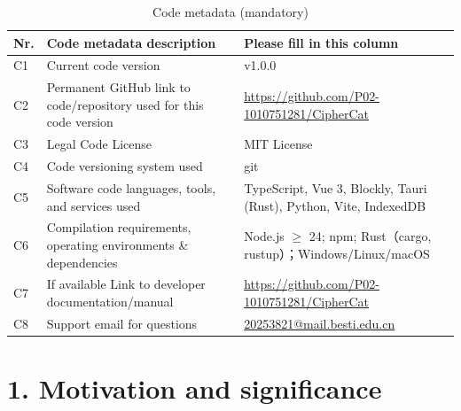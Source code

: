 \documentclass[preprint,12pt,a4paper]{elsarticle}
\begin{document}
\begin{table}[!h]
	\centering
	\begin{tabular}{|l|p{5.8cm}|p{5.8cm}|}
		\hline
		\textbf{Nr.} & \textbf{Code metadata description}                                  & \textbf{Please fill in this column}                               \\
		\hline
		C1           & Current code version                                                & v1.0.0                                                            \\
		\hline
		C2           & Permanent GitHub link to code/repository used for this code version & \url{https://github.com/P02-1010751281/CipherCat}                 \\
		\hline
		C3           & Legal Code License                                                  & MIT License                                                       \\
		\hline
		C4           & Code versioning system used                                         & git                                                               \\
		\hline
		C5           & Software code languages, tools, and services used                   & TypeScript, Vue 3, Blockly, Tauri (Rust), Python, Vite, IndexedDB \\
		\hline
		C6           & Compilation requirements, operating environments \& dependencies    & Node.js $\ge$ 24; npm; Rust（cargo, rustup）；Windows/Linux/macOS    \\
		\hline
		C7           & If available Link to developer documentation/manual                 & \url{https://github.com/P02-1010751281/CipherCat}                 \\
		\hline
		C8           & Support email for questions                                         & \url{20253821@mail.besti.edu.cn}                                  \\
		\hline
	\end{tabular}
	\caption{Code metadata (mandatory)}
	\label{tab:metadata}
\end{table}

\clearpage


\section*{1. Motivation and significance}
\end{document}
